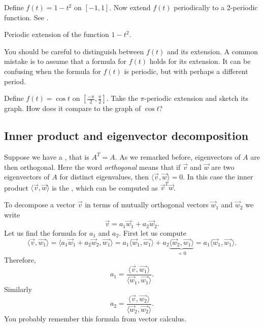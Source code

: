 \documentclass{ximera}
\begin{document}
\begin{example}
    Define $f(t) = 1-t^2$ on $[-1,1]$.  Now extend $f(t)$ periodically to a 2-periodic function.  See .
    \begin{myfig}
        \capstart
        \caption{Periodic extension of the function $1-t^2$.\label{ts:perextofinvertedparabolafig}}
    \end{myfig}
\end{example}

You should be careful to distinguish between $f(t)$ and its extension.  A common mistake is to assume that a formula for $f(t)$ holds for its extension.  It can be confusing when the formula for $f(t)$ is periodic, but with perhaps a different period.

\begin{exercise}
    Define $f(t) = \cos t$ on $[\frac{-\pi}{2},\frac{\pi}{2}]$.  Take the $\pi$-periodic extension and sketch its graph.  How does it compare to the graph of $\cos t$?
\end{exercise}

\subsection{Inner product and eigenvector decomposition}

Suppose we have a \emph{}, that is $A^T = A$.  As we remarked before, eigenvectors of $A$ are then orthogonal.  Here the word \emph{orthogonal} means that if $\vec{v}$ and $\vec{w}$ are two eigenvectors of $A$ for distinct eigenvalues, then $\langle \vec{v} , \vec{w} \rangle = 0$. In this case the inner product $\langle \vec{v} , \vec{w} \rangle$ is the \emph{}, which can be computed as $\vec{v}^T\vec{w}$.

To decompose a vector $\vec{v}$ in terms of mutually orthogonal vectors $\vec{w}_1$ and $\vec{w}_2$ we write
\begin{equation*}
    \vec{v} = a_1 \vec{w}_1  + a_2 \vec{w}_2 .
\end{equation*}
Let us find the formula for $a_1$ and $a_2$.  First let us compute
\begin{equation*}
    \langle \vec{v} , \vec{w_1} \rangle
    = \langle a_1 \vec{w}_1  + a_2 \vec{w}_2 , \vec{w_1} \rangle = a_1 \langle \vec{w}_1 , \vec{w_1} \rangle
    + a_2 \underbrace{\langle \vec{w}_2 , \vec{w_1} \rangle}_{=0} = a_1 \langle \vec{w}_1 , \vec{w_1} \rangle .
\end{equation*}
Therefore,
\begin{equation*}
    a_1 = \frac{\langle \vec{v} , \vec{w_1} \rangle}{\langle \vec{w}_1 , \vec{w_1} \rangle} .
\end{equation*}
Similarly
\begin{equation*}
    a_2 = \frac{\langle \vec{v} , \vec{w_2} \rangle}{\langle \vec{w}_2 , \vec{w_2} \rangle} .
\end{equation*}
You probably remember this formula from vector calculus.
\end{document}
